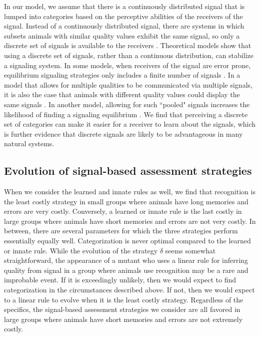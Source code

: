 In our model, we assume that there is a continuously distributed signal that is lumped into categories based on the perceptive abilities of the receivers of the signal. Instead of a continuously distributed signal, there are systems in which subsets animals with similar quality values exhibit the same signal, so only a discrete set of signals is available to the receivers \citep{Johnstone:1994uq}. Theoretical models show that using a discrete set of signals, rather than a continuous distribution, can stabilize a signaling system. In some models, when receivers of the signal are error prone, equilibrium signaling strategies only includes a finite number of signals \citep{Grafen:1993kx,Johnstone:1994uq}. In a model that allows for multiple qualities to be communicated via multiple signals, it is also the case that animals with different quality values could display the same signals \citep{Johnstone:1995vn}. In another model, allowing for such ``pooled" signals increases the likelihood of finding a signaling equilibrium \citep{Lachmann:1998fk}. We find that perceiving a discrete set of categories can make it easier for a receiver to learn about the signals, which is further evidence that discrete signals are likely to be advantageous in many natural systems.

\subsection*{Evolution of signal-based assessment strategies} 

When we consider the learned and innate rules as well, we find that recognition is the least costly strategy in small groups where animals have long memories and errors are very costly. Conversely, a learned or innate rule is the last costly in large groups where animals have short memories and errors are not very costly. In between, there are several parameters for which the three strategies perform essentially equally well. Categorization is never optimal compared to the learned or innate rule. While the evolution of the strategy $\delta$ seems somewhat straightforward, the appearance of a mutant who uses a linear rule for inferring quality from signal in a group where animals use recognition may be a rare and improbable event. If it is exceedingly unlikely, then we would expect to find categorization in the circumstances described above. If not, then we would expect to a linear rule to evolve when it is the least costly strategy. Regardless of the specifics, the signal-based assessment strategies we consider are all favored in large groups where animals have short memories and errors are not extremely costly.

